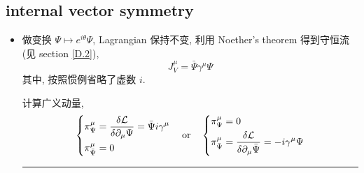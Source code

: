 \subsection{internal vector symmetry} \label{subsection 7.3.1}
\begin{itemize}
	\item 做变换 $\Psi \mapsto e^{i \theta} \Psi$, Lagrangian 保持不变, 利用 Noether's theorem 得到守恒流 (见 section \ref{D.2}),
	\begin{equation} \label{7.3.3}
		J_V^\mu = \bar{\Psi} \gamma^\mu \Psi
	\end{equation}
	其中, 按照惯例省略了虚数 $i$.
	
	\begin{tcolorbox}[title=calculation:]
		计算广义动量,
		\begin{equation} \label{7.3.4}
			\begin{dcases}
				\pi_\Psi^\mu = \frac{\delta \mathcal{L}}{\delta \partial_\mu \Psi} = \bar{\Psi} i \gamma^\mu \\
				\pi_{\bar{\Psi}}^\mu = 0
			\end{dcases} \quad \text{or} \quad \begin{dcases}
				\pi_\Psi^\mu = 0 \\
				\pi_{\bar{\Psi}}^\mu = \frac{\delta \mathcal{L}}{\delta \partial_\mu \bar{\Psi}} = - i \gamma^\mu \Psi
			\end{dcases}
		\end{equation}
		
		\noindent\rule[0.5ex]{\linewidth}{0.5pt} %
		

\end{tcolorbox}
\end{itemize}
